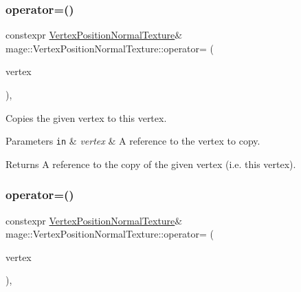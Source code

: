 \subsubsection{\texorpdfstring{operator=()}{operator=()}\hspace{0.1cm}{\footnotesize\ttfamily [1/2]}}
{\footnotesize\ttfamily constexpr \hyperlink{structmage_1_1_vertex_position_normal_texture}{Vertex\+Position\+Normal\+Texture}\& mage\+::\+Vertex\+Position\+Normal\+Texture\+::operator= (\begin{DoxyParamCaption}\item[{const \hyperlink{structmage_1_1_vertex_position_normal_texture}{Vertex\+Position\+Normal\+Texture} \&}]{vertex }\end{DoxyParamCaption})\hspace{0.3cm}{\ttfamily [default]}, {\ttfamily [noexcept]}}

Copies the given vertex to this vertex.


\begin{DoxyParams}[1]{Parameters}
\mbox{\tt in}  & {\em vertex} & A reference to the vertex to copy. \\
\hline
\end{DoxyParams}
\begin{DoxyReturn}{Returns}
A reference to the copy of the given vertex (i.\+e. this vertex). 
\end{DoxyReturn}
\hypertarget{structmage_1_1_vertex_position_normal_texture_a2072550a0506fc6b976487d410df686e}{}\label{structmage_1_1_vertex_position_normal_texture_a2072550a0506fc6b976487d410df686e} 
\subsubsection{\texorpdfstring{operator=()}{operator=()}\hspace{0.1cm}{\footnotesize\ttfamily [2/2]}}
{\footnotesize\ttfamily constexpr \hyperlink{structmage_1_1_vertex_position_normal_texture}{Vertex\+Position\+Normal\+Texture}\& mage\+::\+Vertex\+Position\+Normal\+Texture\+::operator= (\begin{DoxyParamCaption}\item[{\hyperlink{structmage_1_1_vertex_position_normal_texture}{Vertex\+Position\+Normal\+Texture} \&\&}]{vertex }\end{DoxyParamCaption})\hspace{0.3cm}{\ttfamily [default]}, {\ttfamily [noexcept]}}

